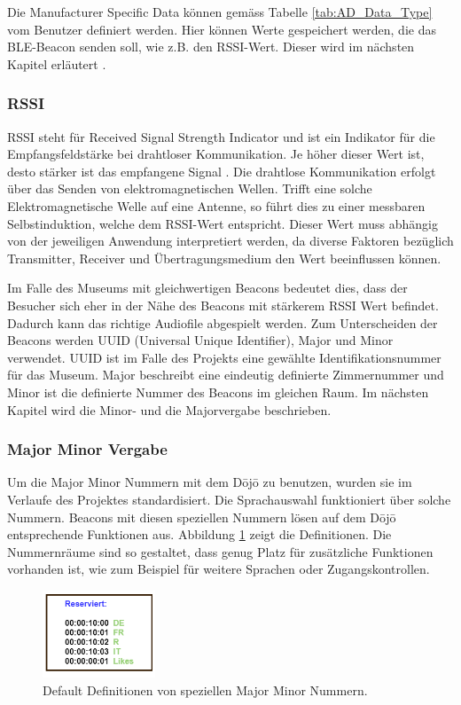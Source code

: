 Die Manufacturer Specific Data können gemäss Tabelle \ref{tab:AD_Data_Type} vom Benutzer definiert werden. Hier können Werte gespeichert werden, die das BLE-Beacon senden soll, wie z.B. den RSSI-Wert. Dieser wird im nächsten Kapitel erläutert \cite{9_Teildokument_BT}.

\subsubsection{RSSI}
RSSI steht für Received Signal Strength Indicator und ist ein Indikator für die Empfangsfeldstärke bei drahtloser Kommunikation. Je höher dieser Wert ist, desto stärker ist das empfangene Signal \cite{10_Teildokument_BT}. Die drahtlose Kommunikation erfolgt über das Senden von elektromagnetischen Wellen. Trifft eine solche Elektromagnetische Welle auf eine Antenne, so führt dies zu einer messbaren Selbstinduktion, welche dem RSSI-Wert entspricht. Dieser Wert muss abhängig von der jeweiligen Anwendung interpretiert werden, da diverse Faktoren bezüglich Transmitter, Receiver und Übertragungsmedium den Wert beeinflussen können.

Im Falle des Museums mit gleichwertigen Beacons bedeutet dies, dass der Besucher sich eher in der Nähe des Beacons mit stärkerem RSSI Wert befindet. Dadurch kann das richtige Audiofile abgespielt werden. Zum Unterscheiden der Beacons werden UUID (Universal Unique Identifier), Major und Minor verwendet. UUID ist im Falle des Projekts eine gewählte Identifikationsnummer für das Museum. Major beschreibt eine eindeutig definierte Zimmernummer und Minor ist die definierte Nummer des Beacons im gleichen Raum. Im nächsten Kapitel wird die Minor- und die Majorvergabe beschrieben.

\subsubsection{Major Minor Vergabe}
Um die Major Minor Nummern mit dem Dōjō zu benutzen, wurden sie im Verlaufe des Projektes standardisiert. Die Sprachauswahl funktioniert über solche Nummern. Beacons mit diesen speziellen Nummern lösen auf dem Dōjō entsprechende Funktionen aus. Abbildung \ref{fig:Bluetooth_def_MM} zeigt die Definitionen. Die Nummernräume sind so gestaltet, dass genug Platz für zusätzliche Funktionen vorhanden ist, wie zum Beispiel für weitere Sprachen oder Zugangskontrollen.

\begin{figure}[htbp!!!!]
	\centering
	\includegraphics[width=0.3\textwidth]{Data/Reserviert_picture.png}
	\caption[Software:Definierte MM]{Default Definitionen von speziellen Major Minor Nummern.}
	\label{fig:Bluetooth_def_MM}
\end{figure}

